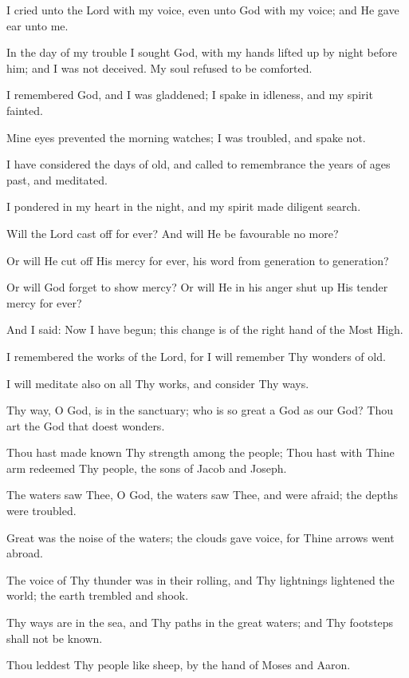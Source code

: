 I cried unto the Lord with my voice, even unto God with my voice; and He gave ear unto me.

In the day of my trouble I sought God, with my hands lifted up by night before him; and I was not deceived. My soul refused to be comforted.

I remembered God, and I was gladdened; I spake in idleness, and my spirit fainted.

Mine eyes prevented the morning watches; I was troubled, and spake not.

I have considered the days of old, and called to remembrance the years of ages past, and meditated.

I pondered in my heart in the night, and my spirit made diligent search.

Will the Lord cast off for ever? And will He be favourable no more?

Or will He cut off His mercy for ever, his word from generation to generation?

Or will God forget to show mercy? Or will He in his anger shut up His tender mercy for ever?

And I said: Now I have begun; this change is of the right hand of the Most High.

I remembered the works of the Lord, for I will remember Thy wonders of old.

I will meditate also on all Thy works, and consider Thy ways.

Thy way, O God, is in the sanctuary; who is so great a God as our God? Thou art the God that doest wonders.

Thou hast made known Thy strength among the people; Thou hast with Thine arm redeemed Thy people, the sons of Jacob and Joseph.

The waters saw Thee, O God, the waters saw Thee, and were afraid; the depths were troubled.

Great was the noise of the waters; the clouds gave voice, for Thine arrows went abroad.

The voice of Thy thunder was in their rolling, and Thy lightnings lightened the world; the earth trembled and shook.

Thy ways are in the sea, and Thy paths in the great waters; and Thy footsteps shall not be known.

Thou leddest Thy people like sheep, by the hand of Moses and Aaron.
